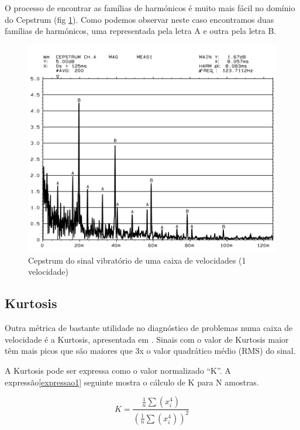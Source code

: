 O processo de encontrar as famílias de harmónicos é muito mais fácil no domínio do Cepstrum (fig \ref{spectrum Cepstrum2}). Como podemos observar neste caso encontramos duas famílias de harmónicos, uma representada pela letra A e outra pela letra B.


\begin{figure}[H]
\centering
\includegraphics[scale=0.35]{figs/spectrum_cepstrum2}
\caption{Cepstrum do sinal vibratório de uma caixa de velocidades (1 velocidade) \cite{Notes2}}\label{spectrum Cepstrum2}
\end{figure}

\subsection{Kurtosis}

Outra métrica de bastante utilidade no diagnóstico de problemas numa caixa de velocidade é a Kurtosis, apresentada em \cite{Kurtosis}. Sinais com o valor de Kurtosis maior têm mais picos que são maiores que 3x o valor quadrático médio (RMS) do sinal.

A Kurtosis pode ser expressa como o valor normalizado ``K''. A expressão\ref{expressao1} seguinte mostra o cálculo de K para N amostras.


\begin{equation}	
	K = \frac{\frac{1}{n}\sum \left ( x_{i}^{4} \right )}{(\frac{1}{n}\sum (x_{i}^{4}))^{2}}
\label{expressao1}
\end{equation}

